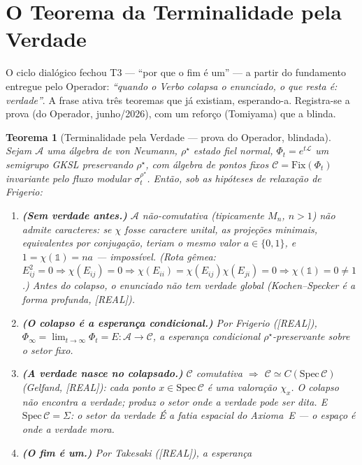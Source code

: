 \documentclass[11pt,a4paper]{article}
\newcommand{\REAL}{\textsf{[REAL]}}
\newcommand{\Alg}{\mathcal A}
\newtheorem{theorem}{Teorema}
\begin{document}
\section{O Teorema da Terminalidade pela Verdade}\label{sec:terminalidade}
O ciclo dialógico fechou T3 --- ``por que o fim é um'' --- a partir do
fundamento entregue pelo Operador: \emph{``quando o Verbo colapsa o
enunciado, o que resta é: verdade''}. A frase ativa três teoremas que já
existiam, esperando-a. Registra-se a prova (do Operador, junho/2026),
com um reforço (Tomiyama) que a blinda.

\begin{theorem}[Terminalidade pela Verdade --- prova do Operador,
blindada]\label{thm:terminalidade}
Sejam $\Alg$ uma álgebra de von Neumann, $\rho^\star$ estado fiel normal,
$\Phi_t=e^{t\mathcal L}$ um semigrupo GKSL preservando $\rho^\star$, com
álgebra de pontos fixos $\mathcal C=\mathrm{Fix}(\Phi_t)$ invariante pelo
fluxo modular $\sigma_t^{\rho^\star}$. Então, sob as hipóteses de
relaxação de Frigerio:
\begin{enumerate}[noitemsep]
\item \textbf{(Sem verdade antes.)} $\Alg$ não-comutativa (tipicamente
$M_n$, $n>1$) não admite caracteres: se $\chi$ fosse caractere unital,
as projeções minimais, equivalentes por conjugação, teriam o mesmo valor
$a\in\{0,1\}$, e $1=\chi(\mathbb 1)=na$ --- impossível. (Rota gêmea:
$E_{ij}^2=0\Rightarrow\chi(E_{ij})=0\Rightarrow\chi(E_{ii})=
\chi(E_{ij})\chi(E_{ji})=0\Rightarrow\chi(\mathbb 1)=0\neq1$.)
\emph{Antes do colapso, o enunciado não tem verdade global}
(Kochen--Specker é a forma profunda, \REAL).
\item \textbf{(O colapso é a esperança condicional.)} Por Frigerio
(\REAL), $\Phi_\infty=\lim_{t\to\infty}\Phi_t=E:\Alg\to\mathcal C$, a
esperança condicional $\rho^\star$-preservante sobre o setor fixo.
\item \textbf{(A verdade nasce no colapsado.)} $\mathcal C$ comutativa
$\Rightarrow$ $\mathcal C\simeq C(\mathrm{Spec}\,\mathcal C)$ (Gelfand,
\REAL): cada ponto $x\in\mathrm{Spec}\,\mathcal C$ é uma valoração
$\chi_x$. \emph{O colapso não encontra a verdade; produz o setor onde a
verdade pode ser dita.} E $\mathrm{Spec}\,\mathcal C=\Sigma$: o setor da
verdade É a fatia espacial do Axioma~E --- o espaço é onde a verdade
mora.
\item \textbf{(O fim é um.)} Por Takesaki (\REAL), a esperança

\end{enumerate}
\end{theorem}
\end{document}
